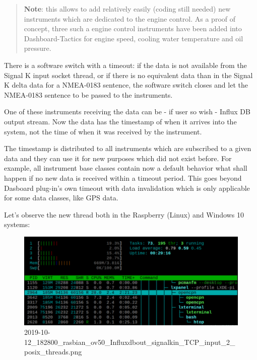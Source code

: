 \documentclass[11pt]{article}
\begin{document}
    \begin{quote}
\textbf{Note}: this allows to add relatively easily (coding still
needed) new instruments which are dedicated to the engine control. As a
proof of concept, three such a engine control instruments have been
added into Dashboard-Tactics for engine speed, cooling water temperature
and oil pressure.
\end{quote}

    There is a software switch with a timeout: if the data is not available
from the Signal K input socket thread, or if there is no equivalent data
than in the Signal K delta data for a NMEA-0183 sentence, the software
switch closes and let the NMEA-0183 sentence to be passed to the
instruments.

    One of these instruments receiving the data can be - if user so wish -
Influx DB output stream. Now the data has the timestamp of when it
arrives into the system, not the time of when it was received by the
instrument.

    The timestamp is distributed to all instruments which are subscribed to
a given data and they can use it for new purposes which did not exist
before. For example, all instrument base classes contain now a default
behavior what shall happen if no new data is received within a timeout
period. This goes beyond Dasboard plug-in's own timeout with data
invalidation which is only applicable for some data classes, like GPS
data.

    Let's observe the new thread both in the Raspberry (Linux) and Windows
10 systems:

    \begin{figure}
\centering
\includegraphics{2019-10-12_182800_rasbian_ov50_Influxdbout_signalkin_TCP_input_2_posix_threads.png}
\caption{2019-10-12\_182800\_rasbian\_ov50\_Influxdbout\_signalkin\_TCP\_input\_2\_posix\_threads.png}
\end{figure}
\end{document}
